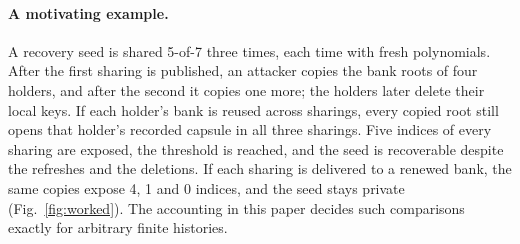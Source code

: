 \documentclass[pdflatex,sn-mathphys-num,twocolumn]{sn-jnl}
\theoremstyle{plain}
\theoremstyle{definition}
\begin{document}
\paragraph{A motivating example.}
A recovery seed is shared 5-of-7 three times, each time with fresh polynomials. After the first sharing is published, an attacker copies the bank roots of four holders, and after the second it copies one more; the holders later delete their local keys. If each holder's bank is reused across sharings, every copied root still opens that holder's recorded capsule in all three sharings. Five indices of every sharing are exposed, the threshold is reached, and the seed is recoverable despite the refreshes and the deletions. If each sharing is delivered to a renewed bank, the same copies expose 4, 1 and 0 indices, and the seed stays private (Fig.~\ref{fig:worked}). The accounting in this paper decides such comparisons exactly for arbitrary finite histories.
\end{document}
